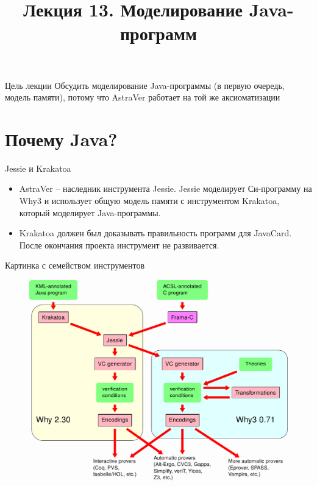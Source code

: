 \documentclass[hyperref={unicode=true}]{beamer}
\title{Лекция 13. Моделирование Java-программ}
\author{}
\date{}
\begin{document}
	\begin{frame}{}
		\titlepage
	\end{frame}

    \begin{frame}{Цель лекции}
    Обсудить моделирование Java-программы (в
    первую очередь, модель памяти), потому что
    AstraVer работает на той же аксиоматизации
    \end{frame}

    \section{Почему Java?}

    \begin{frame}{Jessie и Krakatoa}
    \begin{itemize}
    \item
    AstraVer -- наследник инструмента Jessie.
    Jessie моделирует Си-программу на Why3
    и использует общую модель памяти с
    инструментом Krakatoa, который моделирует
    Java-программы.
    \item
    Krakatoa должен был доказывать правильность
    программ для JavaCard. После окончания
    проекта инструмент не развивается.
    \end{itemize}
    \end{frame}

    \begin{frame}{Картинка с семейством инструментов}
    \begin{figure}
    \includegraphics[height=0.8\textheight]{why_frama_c2-mps.png}
    \end{figure}
    \end{frame}
\end{document}
